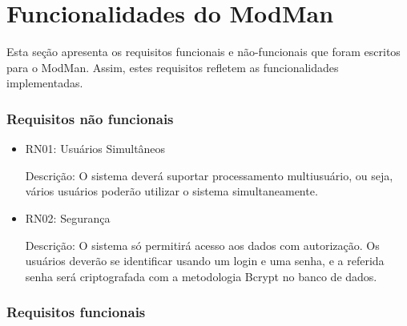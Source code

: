 \section{Funcionalidades do ModMan}\label{sec:funcionalidades}


Esta seção apresenta os requisitos funcionais e não-funcionais que foram escritos para o ModMan. Assim, estes requisitos refletem as funcionalidades implementadas.


\subsubsection{Requisitos não funcionais}


\begin{itemize}
	
	
\item RN01: Usuários Simultâneos


Descrição: O sistema deverá suportar processamento multiusuário, ou seja, vários usuários poderão utilizar o sistema simultaneamente. 


\item RN02: Segurança 


Descrição: O sistema só permitirá acesso aos dados com autorização. Os usuários deverão se identificar usando um login e uma senha, e a referida senha será criptografada com a metodologia Bcrypt no banco de dados.


\end{itemize}
	

\subsubsection{Requisitos funcionais}


